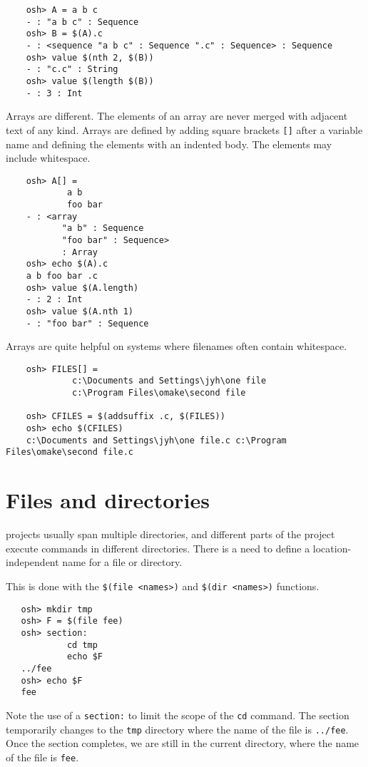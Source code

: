 \begin{verbatim}
    osh> A = a b c
    - : "a b c" : Sequence
    osh> B = $(A).c
    - : <sequence "a b c" : Sequence ".c" : Sequence> : Sequence
    osh> value $(nth 2, $(B))
    - : "c.c" : String
    osh> value $(length $(B))
    - : 3 : Int
\end{verbatim}

Arrays are different.  The elements of an array are never merged with
adjacent text of any kind.  Arrays are defined by adding square
brackets \verb+[]+ after a variable name and defining the elements
with an indented body.  The elements may include whitespace.

\begin{verbatim}
    osh> A[] =
            a b
            foo bar
    - : <array
           "a b" : Sequence
           "foo bar" : Sequence>
           : Array
    osh> echo $(A).c
    a b foo bar .c
    osh> value $(A.length)
    - : 2 : Int
    osh> value $(A.nth 1)
    - : "foo bar" : Sequence
\end{verbatim}

Arrays are quite helpful on systems where filenames often contain whitespace.

\begin{verbatim}
    osh> FILES[] =
             c:\Documents and Settings\jyh\one file
             c:\Program Files\omake\second file

    osh> CFILES = $(addsuffix .c, $(FILES))
    osh> echo $(CFILES)
    c:\Documents and Settings\jyh\one file.c c:\Program Files\omake\second file.c
\end{verbatim}

\section{Files and directories}

\OMake{} projects usually span multiple directories, and different parts of the project execute
commands in different directories.  There is a need to define a location-independent name for a file
or directory.

This is done with the \verb+$(file <names>)+ and \verb+$(dir <names>)+ functions.

\begin{verbatim}
   osh> mkdir tmp
   osh> F = $(file fee)
   osh> section:
            cd tmp
            echo $F
   ../fee
   osh> echo $F
   fee
\end{verbatim}

Note the use of a \verb+section:+ to limit the scope of the \verb+cd+ command.  The section
temporarily changes to the \verb+tmp+ directory where the name of the file is \verb+../fee+.  Once
the section completes, we are still in the current directory, where the name of the file is
\verb+fee+.

